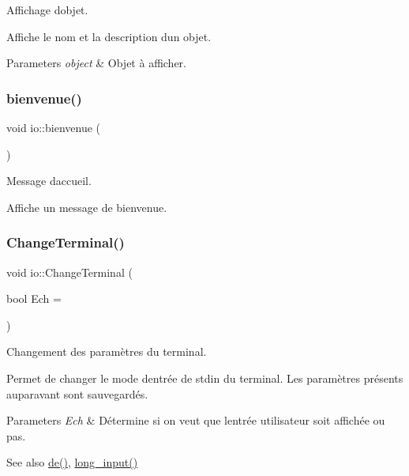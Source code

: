 Affichage d\textquotesingle{}objet. 

Affiche le nom et la description d\textquotesingle{}un objet. 
\begin{DoxyParams}{Parameters}
{\em object} & Objet à afficher. \\
\hline
\end{DoxyParams}
\mbox{\label{namespaceio_a7fdf85a0d766d2dcdb9870ae0458826a}} 
\subsubsection{\texorpdfstring{bienvenue()}{bienvenue()}}
{\footnotesize\ttfamily void io\+::bienvenue (\begin{DoxyParamCaption}{ }\end{DoxyParamCaption})}



Message d\textquotesingle{}accueil. 

Affiche un message de bienvenue. \mbox{\label{namespaceio_ac0223d0ecfee82d8cc86543604173b73}} 
\subsubsection{\texorpdfstring{Change\+Terminal()}{ChangeTerminal()}}
{\footnotesize\ttfamily void io\+::\+Change\+Terminal (\begin{DoxyParamCaption}\item[{bool}]{Ech = {} }\end{DoxyParamCaption})}



Changement des paramètres du terminal. 

Permet de changer le mode d\textquotesingle{}entrée de stdin du terminal. Les paramètres présents auparavant sont sauvegardés. 
\begin{DoxyParams}{Parameters}
{\em Ech} & Détermine si on veut que l\textquotesingle{}entrée utilisateur soit affichée ou pas. \\
\hline
\end{DoxyParams}
\begin{DoxySeeAlso}{See also}
\hyperlink{namespaceio_ae9908b55f26f07e78043d7cfad003d22}{de()}, \hyperlink{namespaceio_ab044be3afd7ac04eeb1a496af0f1d5c6}{long\+\_\+input()} 
\end{DoxySeeAlso}
\mbox{\label{namespaceio_ac79ddb3191a9d00d007eb48deb315942}} 
